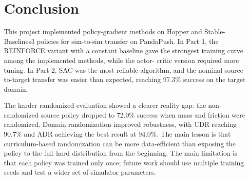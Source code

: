   \section{Conclusion}

  This project implemented policy-gradient methods on Hopper and Stable-Baselines3 policies for sim-to-sim transfer on PandaPush. In Part 1, the REINFORCE variant with a constant baseline gave the strongest training curve among the implemented methods, while the actor-
  critic version required more tuning. In Part 2, SAC was the most reliable algorithm, and the nominal source-to-target transfer was easier than expected, reaching 97.3\% success on the target domain.

  The harder randomized evaluation showed a clearer reality gap: the non-randomized source policy dropped to 72.0\% success when mass and friction were randomized. Domain randomization improved robustness, with UDR reaching 90.7\% and ADR achieving the best result at
  94.0\%. The main lesson is that curriculum-based randomization can be more data-efficient than exposing the policy to the full hard distribution from the beginning. The main limitation is that each policy was trained only once; future work should use multiple training
  seeds and test a wider set of simulator parameters.